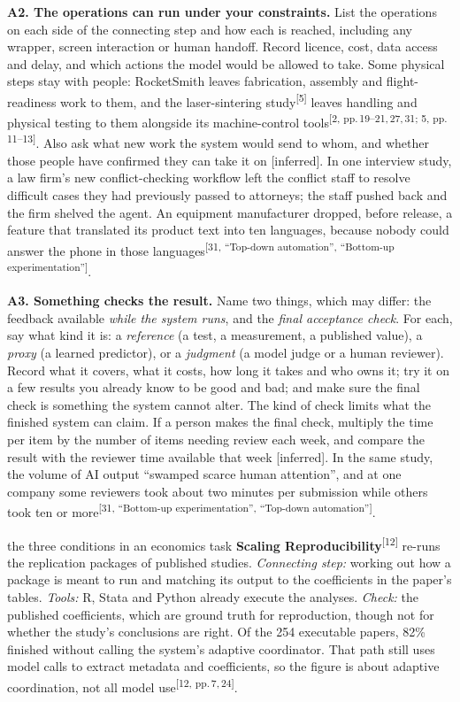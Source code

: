\documentclass[10pt]{article}
\newcommand{\inferred}{\textsf{\small[inferred]}}
\newcommand{\p}[1]{\textsuperscript{[#1]}}
\begin{document}
\textbf{A2. The operations can run under your constraints.}
List the operations on each side of the connecting step and how each is reached, including any wrapper, screen interaction or human handoff. Record licence, cost, data access and delay, and which actions the model would be allowed to take. Some physical steps stay with people: RocketSmith leaves fabrication, assembly and flight-readiness work to them, and the laser-sintering study\p{5} leaves handling and physical testing to them alongside its machine-control tools\p{2, pp.\,19--21,\,27,\,31; 5, pp.\,11--13}.
Also ask what new work the system would send to whom, and whether those people have confirmed they can take it on \inferred.
In one interview study, a law firm's new conflict-checking workflow left the conflict staff to resolve difficult cases they had previously passed to attorneys; the staff pushed back and the firm shelved the agent. An equipment manufacturer dropped, before release, a feature that translated its product text into ten languages, because nobody could answer the phone in those languages\p{31, ``Top-down automation'', ``Bottom-up experimentation''}.

\textbf{A3. Something checks the result.}
Name two things, which may differ: the feedback available \emph{while the system runs}, and the \emph{final acceptance check}.
For each, say what kind it is: a \emph{reference} (a test, a measurement, a published value), a \emph{proxy} (a learned predictor), or a \emph{judgment} (a model judge or a human reviewer).
Record what it covers, what it costs, how long it takes and who owns it; try it on a few results you already know to be good and bad; and make sure the final check is something the system cannot alter.
The kind of check limits what the finished system can claim.
If a person makes the final check, multiply the time per item by the number of items needing review each week, and compare the result with the reviewer time available that week \inferred.
In the same study, the volume of AI output ``swamped scarce human attention'', and at one company some reviewers took about two minutes per submission while others took ten or more\p{31, ``Bottom-up experimentation'', ``Top-down automation''}.

\begin{example}{the three conditions in an economics task}
\textbf{Scaling Reproducibility}\p{12} re-runs the replication packages of published studies. \emph{Connecting step:} working out how a package is meant to run and matching its output to the coefficients in the paper's tables. \emph{Tools:} R, Stata and Python already execute the analyses. \emph{Check:} the published coefficients, which are ground truth for reproduction, though not for whether the study's conclusions are right. Of the 254 executable papers, 82\% finished without calling the system's adaptive coordinator. That path still uses model calls to extract metadata and coefficients, so the figure is about adaptive coordination, not all model use\p{12, pp.\,7,\,24}.
\end{example}
\end{document}

